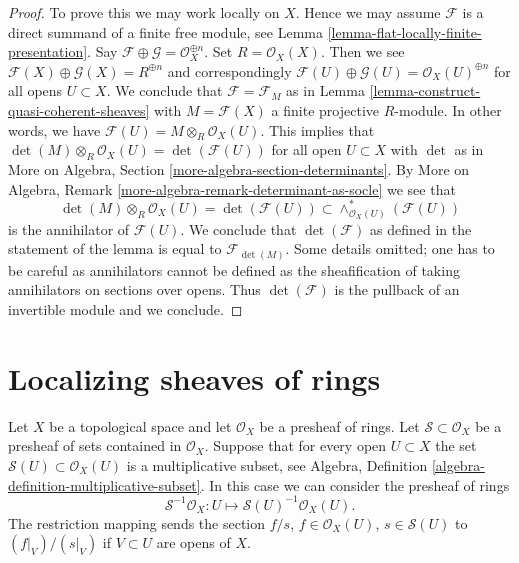 \begin{proof}
To prove this we may work locally on $X$. Hence we may assume $\mathcal{F}$
is a direct summand of a finite free module, see
Lemma \ref{lemma-flat-locally-finite-presentation}. Say
$\mathcal{F} \oplus \mathcal{G} = \mathcal{O}_X^{\oplus n}$.
Set $R = \mathcal{O}_X(X)$. Then we see
$\mathcal{F}(X) \oplus \mathcal{G}(X) = R^{\oplus n}$
and correspondingly
$\mathcal{F}(U) \oplus \mathcal{G}(U) = \mathcal{O}_X(U)^{\oplus n}$
for all opens $U \subset X$.
We conclude that $\mathcal{F} = \mathcal{F}_M$ as in
Lemma \ref{lemma-construct-quasi-coherent-sheaves}
with $M = \mathcal{F}(X)$ a finite projective $R$-module.
In other words, we have $\mathcal{F}(U) = M \otimes_R \mathcal{O}_X(U)$.
This implies that
$\det(M) \otimes_R \mathcal{O}_X(U) = \det(\mathcal{F}(U))$
for all open $U \subset X$ with $\det$ as in
More on Algebra, Section \ref{more-algebra-section-determinants}. By
More on Algebra, Remark \ref{more-algebra-remark-determinant-as-socle}
we see that
$$
\det(M) \otimes_R \mathcal{O}_X(U) =
\det(\mathcal{F}(U)) \subset
\wedge^*_{\mathcal{O}_X(U)}(\mathcal{F}(U))
$$
is the annihilator of $\mathcal{F}(U)$. We conclude that
$\det(\mathcal{F})$ as defined in the statement of the lemma
is equal to $\mathcal{F}_{\det(M)}$. Some details omitted; one has
to be careful as annihilators cannot be defined as the sheafification
of taking annihilators on sections over opens. Thus $\det(\mathcal{F})$
is the pullback of an invertible module and we conclude.
\end{proof}
















\section{Localizing sheaves of rings}
\label{section-localizing-sheaves-rings}

\noindent
Let $X$ be a topological space and let $\mathcal{O}_X$ be a
presheaf of rings. Let $\mathcal{S} \subset \mathcal{O}_X$
be a presheaf of sets contained in $\mathcal{O}_X$.
Suppose that for every open $U \subset X$ the set
$\mathcal{S}(U) \subset \mathcal{O}_X(U)$ is a multiplicative subset, see
Algebra, Definition \ref{algebra-definition-multiplicative-subset}.
In this case we can consider the presheaf of rings
$$
\mathcal{S}^{-1}\mathcal{O}_X :
U \longmapsto \mathcal{S}(U)^{-1}\mathcal{O}_X(U).
$$
The restriction mapping sends the section $f/s$, $f \in \mathcal{O}_X(U)$,
$s \in \mathcal{S}(U)$ to $(f|_V)/(s|_V)$ if $V \subset U$ are opens
of $X$.

